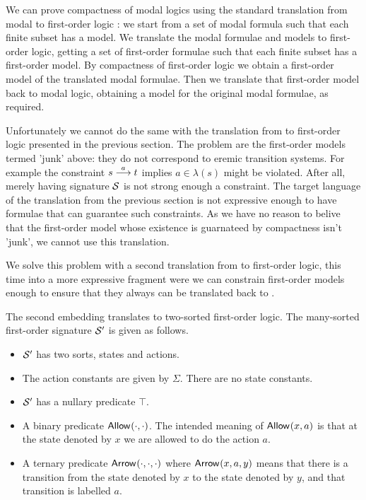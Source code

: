 We can prove compactness of modal logics using the standard
translation from modal to first-order logic \cite{BlackburnP:modlog}:
we start from a set of modal formula such that each finite subset has
a model. We translate the modal formulae and models to first-order
logic, getting a set of first-order formulae such that each finite
subset has a first-order model. By compactness of first-order logic we
obtain a first-order model of the translated modal formulae. Then we
translate that first-order model back to modal logic, obtaining a
model for the original modal formulae, as required.

Unfortunately we cannot do the same with the translation from \ELABR{}
to first-order logic presented in the previous section. The problem
are the first-order models termed 'junk' above: they do not correspond
to eremic transition systems.  For example the constraint $s
\stackrel{a}{\longrightarrow} t$ implies $a \in \lambda(s)$ might be violated. After all,
merely having signature $\mathcal{S}$ is not strong enough a constraint. The
target language of the translation from the previous section is not
expressive enough to have formulae that can guarantee such
constraints.  As we have no reason to belive that the first-order
model whose existence is guarnateed by compactness isn't 'junk', we
cannot use this translation.

We solve this problem with a second translation from \ELABR{} to
first-order logic, this time into a more expressive fragment were we
can constrain first-order models enough to ensure that they always can
be translated back to \ELFULL{}.

The second embedding translates \ELFULL{} to two-sorted first-order
logic. The many-sorted first-order signature $\mathcal{S}'$ is given as follows.
\begin{itemize}

\item $\mathcal{S}'$ has two sorts, states and actions. 

\item The action constants are given by $\Sigma$. There
are no state constants. 

\item $\mathcal{S}'$ has a nullary predicate $\top$.

\item A binary predicate $\mathsf{Allow}^{}(\cdot, \cdot)$. The intended
  meaning of $\mathsf{Allow}^{}(x, a)$ is that at the state denoted by $x$ we
  are allowed to do the action $a$.

\item A ternary predicate $\mathsf{Arrow}^{}(\cdot, \cdot, \cdot)$ where
  $\mathsf{Arrow}^{}(x, a, y)$ means that there is a transition from the
  state denoted by $x$ to the state denoted by $y$, and that
  transition is labelled $a$.

\end{itemize}

